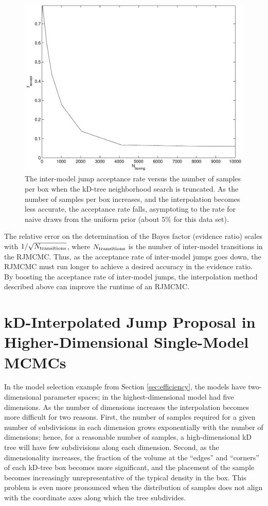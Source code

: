 \documentclass{rsos}
\begin{document}
\begin{figure}
  \begin{center}
    \includegraphics[width=0.8\columnwidth]{Figure2_acceptRate}
  \end{center}
  \caption{\label{fig:acceptRate} The inter-model jump acceptance rate
    versus the number of samples per box when the kD-tree neighborhood
    search is truncated.  As the number of samples per box increases,
    and the interpolation becomes less accurate, the acceptance rate
    falls, asymptoting to the rate for naive draws from the uniform
    prior (about $5\%$ for this data set).}
\end{figure}

The relative error on the determination of the Bayes factor (evidence ratio) scales
with $1/\sqrt{N_{\textnormal{transitions}}}$, where
$N_{\textnormal{transitions}}$ is the number of inter-model
transitions in the RJMCMC.  Thus, as the acceptance rate of
inter-model jumps goes down, the RJMCMC must run longer to achieve a
desired accuracy in the evidence ratio.  By boosting the acceptance
rate of inter-model jumps, the interpolation method described above
can improve the runtime of an RJMCMC.

\section{kD-Interpolated Jump Proposal in Higher-Dimensional
  Single-Model MCMCs}
\label{sec:higherdim}

In the model selection example from Section \ref{sec:efficiency}, the
models have two-dimensional parameter spaces; in \cite{Farr2010} the
highest-dimensional model had five dimensions.  As the number of
dimensions increases the interpolation becomes more difficult for two
reasons.  First, the number of samples required for a given
number of subdivisions in each dimension grows exponentially with
the number of dimensions; hence, for a reasonable number of samples, a high-dimensional kD tree will have few subdivisions along each dimension.  Second, as
the dimensionality increases, the fraction of the volume at the ``edges'' and ``corners'' of each kD-tree box becomes more significant, and the placement of the sample becomes increasingly unrepresentative of the typical density in the box.  This problem is even more
pronounced when the distribution of samples does not align with the
coordinate axes along which the tree subdivides.  
\end{document}

